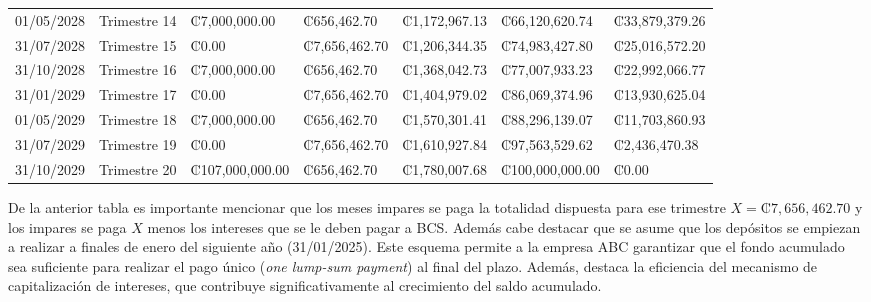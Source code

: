 \documentclass[paper=a4, fontsize=11pt,twoside]{article} %
\begin{document}
\begin{table}[ht]
\begin{tabular}{lllllll}
              01/05/2028 & Trimestre 14 & ₡7,000,000.00 & ₡656,462.70 & ₡1,172,967.13 & ₡66,120,620.74 & ₡33,879,379.26 \\ 
              31/07/2028 & Trimestre 15 & ₡0.00 & ₡7,656,462.70 & ₡1,206,344.35 & ₡74,983,427.80 & ₡25,016,572.20 \\ 
              31/10/2028 & Trimestre 16 & ₡7,000,000.00 & ₡656,462.70 & ₡1,368,042.73 & ₡77,007,933.23 & ₡22,992,066.77 \\ 
              31/01/2029 & Trimestre 17 & ₡0.00 & ₡7,656,462.70 & ₡1,404,979.02 & ₡86,069,374.96 & ₡13,930,625.04 \\ 
              01/05/2029 & Trimestre 18 & ₡7,000,000.00 & ₡656,462.70 & ₡1,570,301.41 & ₡88,296,139.07 & ₡11,703,860.93 \\ 
              31/07/2029 & Trimestre 19 & ₡0.00 & ₡7,656,462.70 & ₡1,610,927.84 & ₡97,563,529.62 & ₡2,436,470.38 \\ 
              31/10/2029 & Trimestre 20 & ₡107,000,000.00 & ₡656,462.70 & ₡1,780,007.68 & ₡100,000,000.00 & ₡0.00 \\ 
               \bottomrule
        \end{tabular}
    \end{table}

    De la anterior tabla es importante mencionar que los meses impares se paga la totalidad dispuesta para ese trimestre $X=₡7,656,462.70$ y los impares se paga $X$ menos los intereses que se le deben pagar a BCS. Además cabe destacar que se asume que los depósitos se empiezan a realizar a finales de enero del siguiente año (31/01/2025). Este esquema permite a la empresa ABC garantizar que el fondo acumulado sea suficiente para realizar el pago único (\textit{one lump-sum payment}) al final del plazo. Además, destaca la eficiencia del mecanismo de capitalización de intereses, que contribuye significativamente al crecimiento del saldo acumulado.
\end{document}
